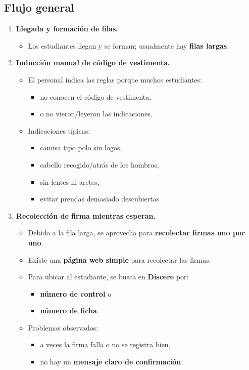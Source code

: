 \documentclass[12pt,a4paper]{article}
\begin{document}
\subsection{Flujo general}
\begin{enumerate}[leftmargin=*, label=\textbf{\arabic*.}]
  \item \textbf{Llegada y formación de filas.}
  \begin{itemize}
    \item Los estudiantes llegan y se forman; usualmente hay \textbf{filas largas}.
  \end{itemize}

  \item \textbf{Inducción manual de código de vestimenta.}
  \begin{itemize}
    \item El personal indica las reglas porque muchos estudiantes:
    \begin{itemize}
      \item no conocen el código de vestimenta,
      \item o no vieron/leyeron las indicaciones.
    \end{itemize}
    \item Indicaciones típicas:
    \begin{itemize}
      \item camisa tipo polo sin logos,
      \item cabello recogido/atrás de los hombros,
      \item sin lentes ni aretes,
      \item evitar prendas demasiado descubiertas
    \end{itemize}
  \end{itemize}

  \item \textbf{Recolección de firma mientras esperan.}
  \begin{itemize}
    \item Debido a la fila larga, se aprovecha para \textbf{recolectar firmas uno por uno}.
    \item Existe una \textbf{página web simple} para recolectar las firmas.
    \item Para ubicar al estudiante, se busca en \textbf{Discere} por:
    \begin{itemize}
      \item \textbf{número de control} o
      \item \textbf{número de ficha}.
    \end{itemize}
    \item Problemas observados:
    \begin{itemize}
      \item a veces la firma falla o no se registra bien,
      \item no hay un \textbf{mensaje claro de confirmación}.
    \end{itemize}
  \end{itemize}


\end{enumerate}
\end{document}
